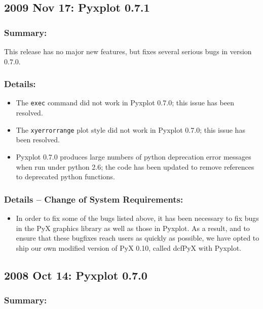 \subsection*{2009 Nov 17: Pyxplot 0.7.1}

\subsubsection*{Summary:}

This release has no major new features, but fixes several serious bugs in version 0.7.0.

\subsubsection*{Details:}

\begin{itemize}
\item The {\tt exec} command did not work in Pyxplot 0.7.0; this issue has been resolved.
\item The {\tt xyerrorrange} plot style did not work in Pyxplot 0.7.0; this issue has been resolved.
\item Pyxplot 0.7.0 produces large numbers of python deprecation error messages when run under python 2.6; the code has been updated to remove references to deprecated python functions.
\end{itemize}

\subsubsection*{Details -- Change of System Requirements:}

\begin{itemize}
\item In order to fix some of the bugs listed above, it has been necessary to
fix bugs in the PyX graphics library as well as those in Pyxplot. As a result,
and to ensure that these bugfixes reach users as quickly as possible, we have
opted to ship our own modified version of PyX 0.10, called dcfPyX with Pyxplot.
\end{itemize}

\subsection*{2008 Oct 14: Pyxplot 0.7.0}

\subsubsection*{Summary:}

